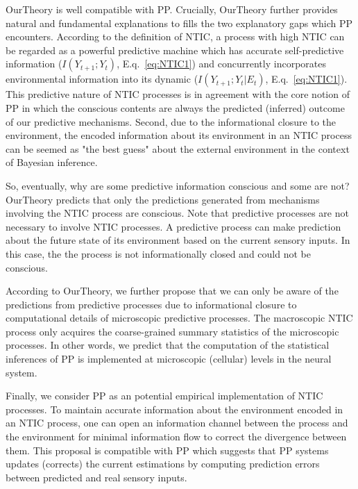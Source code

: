 \documentclass[utf8]{article}
\begin{document}
    		\ac{OurTheory} is well compatible with PP. Crucially, \ac{OurTheory} further provides natural and fundamental explanations to fills the two explanatory gaps which PP encounters. According to the definition of NTIC, a process with high NTIC can be regarded as a powerful predictive machine which has accurate self-predictive information ($I(Y_{t+1};Y_{t})$, E.q.~\ref{eq:NTIC1}) and concurrently incorporates environmental information into its dynamic ($I(Y_{t+1};Y_{t}|E_{t})$, E.q.~\ref{eq:NTIC1}). This predictive nature of NTIC processes is in agreement with the core notion of PP in which the conscious contents are always the predicted (inferred) outcome of our predictive mechanisms. Second, due to the informational closure to the environment, the encoded information about its environment in an NTIC process can be seemed as "the best guess" about the external environment in the context of Bayesian inference. 
    		
    		So, eventually, why are some predictive information conscious and some are not? \ac{OurTheory} predicts that only the predictions generated from mechanisms involving the NTIC process are conscious. Note that predictive processes are not necessary to involve NTIC processes. A predictive process can make prediction about the future state of its environment based on the current sensory inputs. In this case, the the process is not informationally closed and could not be conscious.
    		
            According to \ac{OurTheory}, we further propose that we can only be aware of the predictions from predictive processes due to informational closure to computational details of microscopic predictive processes. The macroscopic NTIC process only acquires the coarse-grained summary statistics of the microscopic processes. In other words, we predict that the computation of the statistical inferences of PP is implemented at microscopic (cellular) levels in the neural system. 
        
    		Finally, we consider PP as an potential empirical implementation of NTIC processes. To maintain accurate information about the environment encoded in an NTIC process, one can open an information channel between the process and the environment for minimal information flow to correct the divergence between them. This proposal is compatible with PP which suggests that PP systems updates (corrects) the current estimations by computing prediction errors between predicted and real sensory inputs. 
\end{document}
